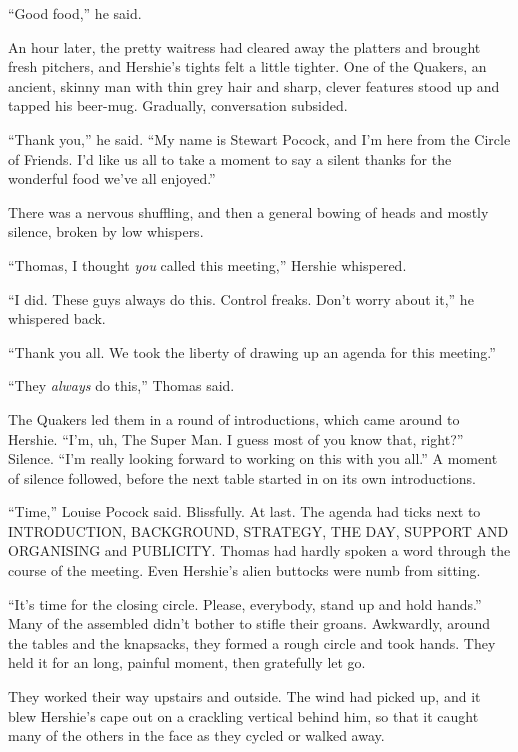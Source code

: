 ``Good food,'' he said.

\tb

An hour later, the pretty waitress had cleared away the platters
and brought fresh pitchers, and Hershie's tights felt a little
tighter. One of the Quakers, an ancient, skinny man with thin grey
hair and sharp, clever features stood up and tapped his beer-mug.
Gradually, conversation subsided.

``Thank you,'' he said.
``My name is Stewart Pocock, and I'm here from the Circle of Friends. I'd like 
us all to take a moment to say a silent thanks for the wonderful food we've all 
enjoyed.''

There was a nervous shuffling, and then a general bowing of heads
and mostly silence, broken by low whispers.

``Thomas, I thought \emph{you} called this meeting,'' Hershie
whispered.

``I did. These guys always do this. Control freaks. Don't worry about it,''
he whispered back.

``Thank you all. We took the liberty of drawing up an agenda for this meeting.''

``They \emph{always} do this,'' Thomas said.

The Quakers led them in a round of introductions, which came around
to Hershie.
``I'm, uh, The Super Man. I guess most of you know that, right?''
Silence.
``I'm really looking forward to working on this with you all.'' A
moment of silence followed, before the next table started in on its
own introductions.

\tb

``Time,'' Louise Pocock said. Blissfully. At last. The agenda had
ticks next to INTRODUCTION, BACKGROUND, STRATEGY, THE DAY, SUPPORT
AND ORGANISING and PUBLICITY. Thomas had hardly spoken a word
through the course of the meeting. Even Hershie's alien buttocks
were numb from sitting.

``It's time for the closing circle. Please, everybody, stand up and hold 
hands.''
Many of the assembled didn't bother to stifle their groans.
Awkwardly, around the tables and the knapsacks, they formed a rough
circle and took hands. They held it for an long, painful moment,
then gratefully let go.

They worked their way upstairs and outside. The wind had picked up,
and it blew Hershie's cape out on a crackling vertical behind him,
so that it caught many of the others in the face as they cycled or
walked away.

